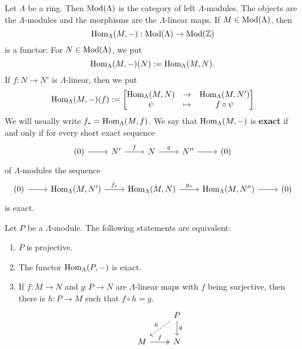 
\begin{example}
Let $\Lambda$ be a ring. Then $\operatorname{Mod}(\Lambda)$ is the category of left $\Lambda$-modules. The objects are the $\Lambda$-modules and the morphisms are the $\Lambda$-linear maps. If $M\in\operatorname{Mod}(\Lambda)$, then
\[
\operatorname{Hom}_\Lambda(M,-) : \operatorname{Mod}(\Lambda) \to \operatorname{Mod}(\mathbb{Z})
\]
is a functor: For $N\in \operatorname{Mod}(\Lambda)$, we put
\[
\operatorname{Hom}_\Lambda(M,-)(N) := \operatorname{Hom}_\Lambda(M,N).
\]
If $f:N\to N'$ is $\Lambda$-linear, then we put
\[
\operatorname{Hom}_\Lambda(M,-)(f) :=
\begin{bmatrix}
\operatorname{Hom}_\Lambda(M,N) & \to & \operatorname{Hom}_\Lambda(M,N') \\
\psi & \mapsto & f \circ \psi
\end{bmatrix}
\]
We will usually write $f_*=\operatorname{Hom}_\Lambda(M,f)$. We say that $\operatorname{Hom}_\Lambda(M,-)$ is \textbf{exact} if and only if for every short exact sequence
\[
\begin{tikzcd}
	(0) \ar[r] & N' \ar[r,"f"] & N \ar[r,"g"] & N'' \ar[r] & (0)
\end{tikzcd}
\]
of $\Lambda$-modules the sequence
\[
\begin{tikzcd}
(0) \ar[r] & \Hom_\Lambda(M,N') \ar[r,"f_*"] & \Hom_\Lambda(M,N) \ar[r,"g_*"] & \Hom_\Lambda(M,N'') \ar[r] & (0)
\end{tikzcd}
\]
is exact.
\end{example}


\begin{proposition}\label{1.4.5}
Let $P$ be a $\Lambda$-module. The following statements are equivalent:
\begin{enumerate}
\item $P$ is projective.
\item The functor $\operatorname{Hom}_\Lambda(P,-)$ is exact.
\item If $f:M\to N$ and $g:P\to N$ are $\Lambda$-linear maps with $f$ being surjective, then there is $h:P\to M$ such that $f\circ h = g$.
%
\[
\begin{tikzcd}
	& P \ar[d,"g"] \ar[ld,dashed,"h"'] \\
	M \ar[r,two heads,"f"] & N
\end{tikzcd}
\]
%
\end{enumerate}
\end{proposition}

